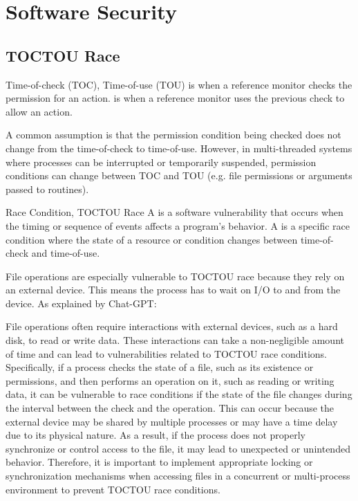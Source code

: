 \chapter{Software Security}

\section{TOCTOU Race}

\begin{dfnbox}{Time-of-check (TOC), Time-of-use (TOU)}{}
     is when a reference monitor checks the permission for an action.  is when a reference monitor uses the previous check to allow an action.
\end{dfnbox}

A common assumption is that the permission condition being checked does not change from the time-of-check to time-of-use. However, in multi-threaded systems where processes can be interrupted or temporarily suspended, permission conditions can change between TOC and TOU (e.g. file permissions or arguments passed to routines).

\begin{dfnbox}{Race Condition, TOCTOU Race}{}
    A  is a software vulnerability that occurs when the timing or sequence of events affects a program's behavior. A  is a specific race condition where the state of a resource or condition changes between time-of-check and time-of-use.
\end{dfnbox}


File operations are especially vulnerable to TOCTOU race because they rely on an external device. This means the process has to wait on I/O to and from the device. As explained by Chat-GPT:

\begin{notebox}
    File operations often require interactions with external devices, such as a hard disk, to read or write data. These interactions can take a non-negligible amount of time and can lead to vulnerabilities related to TOCTOU race conditions. Specifically, if a process checks the state of a file, such as its existence or permissions, and then performs an operation on it, such as reading or writing data, it can be vulnerable to race conditions if the state of the file changes during the interval between the check and the operation. This can occur because the external device may be shared by multiple processes or may have a time delay due to its physical nature. As a result, if the process does not properly synchronize or control access to the file, it may lead to unexpected or unintended behavior. Therefore, it is important to implement appropriate locking or synchronization mechanisms when accessing files in a concurrent or multi-process environment to prevent TOCTOU race conditions.
\end{notebox}

